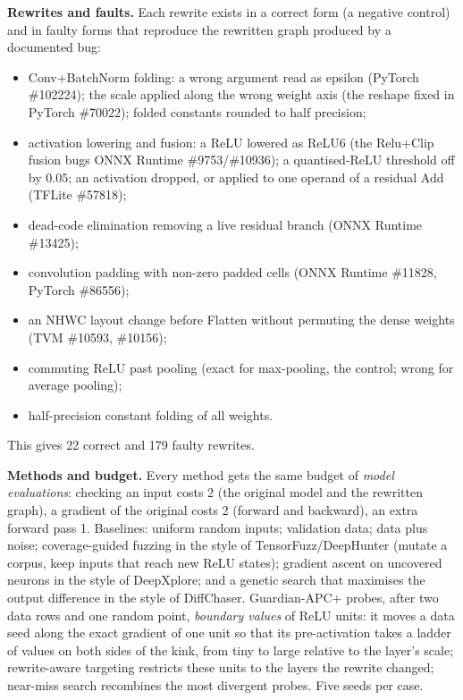 \documentclass[conference]{IEEEtran}
\begin{document}
\textbf{Rewrites and faults.} Each rewrite exists in a correct form (a negative control) and in faulty forms that reproduce the rewritten graph produced by a documented bug:
\begin{itemize}
\item Conv+BatchNorm folding: a wrong argument read as epsilon (PyTorch \#102224); the scale applied along the wrong weight axis (the reshape fixed in PyTorch \#70022); folded constants rounded to half precision;
\item activation lowering and fusion: a ReLU lowered as ReLU6 (the Relu+Clip fusion bugs ONNX Runtime \#9753/\#10936); a quantised-ReLU threshold off by $0.05$; an activation dropped, or applied to one operand of a residual Add (TFLite \#57818);
\item dead-code elimination removing a live residual branch (ONNX Runtime \#13425);
\item convolution padding with non-zero padded cells (ONNX Runtime \#11828, PyTorch \#86556);
\item an NHWC layout change before Flatten without permuting the dense weights (TVM \#10593, \#10156);
\item commuting ReLU past pooling (exact for max-pooling, the control; wrong for average pooling);
\item half-precision constant folding of all weights.
\end{itemize}
This gives 22 correct and 179 faulty rewrites.

\textbf{Methods and budget.} Every method gets the same budget of \emph{model evaluations}: checking an input costs 2 (the original model and the rewritten graph), a gradient of the original costs 2 (forward and backward), an extra forward pass 1. Baselines: uniform random inputs; validation data; data plus noise; coverage-guided fuzzing in the style of TensorFuzz/DeepHunter (mutate a corpus, keep inputs that reach new ReLU states); gradient ascent on uncovered neurons in the style of DeepXplore; and a genetic search that maximises the output difference in the style of DiffChaser. Guardian-APC+ probes, after two data rows and one random point, \emph{boundary values} of ReLU units: it moves a data seed along the exact gradient of one unit so that its pre-activation takes a ladder of values on both sides of the kink, from tiny to large relative to the layer's scale; rewrite-aware targeting restricts these units to the layers the rewrite changed; near-miss search recombines the most divergent probes. Five seeds per case.
\end{document}
